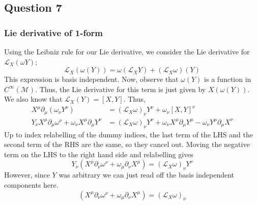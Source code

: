 \documentclass[11pt, a4paper]{article}   	%
\theoremstyle{slplain}
\begin{document}
\pagebreak 

\subsection{Question 7} 

\subsubsection*{Lie derivative of 1-form} 
Using the Leibniz rule for our Lie derivative, we consider the Lie derivative 
for $ \mathcal{ L }_X ( \omega Y ) $; 
\[
\mathcal{ L }_X ( \omega( Y) ) = \omega ( \mathcal{ L }_X Y ) + ( \mathcal{ L }_ X \omega) ( Y) 	
\] This expression is basis independent. 
Now, observe that $ \omega ( Y ) $ is a function in  $ C^ \infty ( \mathcal{ M }) $. 
Thus, the Lie derivative for this term is just given by $ X ( \omega ( Y) )  $. 
We also know that $ \mathcal{  L }_X ( Y )  = [ X, Y ] $. 
Thus, 
\begin{align*}
X^\mu\partial _\mu ( \omega_\nu Y ^\nu) & = (\mathcal{L }_X \omega)_\nu Y ^\nu + \omega_\nu [ X, Y ] ^\nu  \\
Y_\nu X^\mu \partial _\mu \omega^\nu + \omega_\nu X^\mu \partial _\mu Y^\nu  &= ( \mathcal{ L }_ X \omega)_\nu Y ^\nu + \omega_\nu X^\mu \partial_\mu Y^\mu  - \omega_\nu Y^\mu \partial _\mu X^\nu
\end{align*} Up to index relabelling of the dummy indices, the last term of the LHS 
and the second term of the RHS are the same, so they cancel out. 
Moving the negative term on the LHS to the right hand side and relabelling gives 
\[
Y_\nu ( X^\mu \partial_\nu \omega^\nu + \omega_\mu \partial_\nu X^\mu ) = ( \mathcal{ L }_X \omega) _\nu Y ^\nu
\] However, since $ Y $ was arbitrary we can just read off the 
basis independent components here. 
\[
( X^\mu \partial_\nu \omega^\nu + \omega_\mu \partial_\nu X^\mu ) = ( \mathcal{ L }_X \omega) _\nu 
\]
\end{document}
